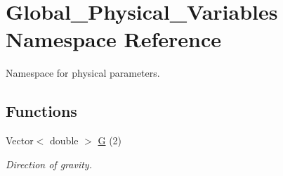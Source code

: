 \hypertarget{namespaceGlobal__Physical__Variables}{}\section{Global\+\_\+\+Physical\+\_\+\+Variables Namespace Reference}
\label{namespaceGlobal__Physical__Variables}


Namespace for physical parameters.  


\subsection*{Functions}
\begin{DoxyCompactItemize}
\item 
Vector$<$ double $>$ \hyperlink{namespaceGlobal__Physical__Variables_a37a6f46efcb35b4bd12c73f19d741020}{G} (2)
\begin{DoxyCompactList}\small\item\em Direction of gravity. \end{DoxyCompactList}\end{DoxyCompactItemize}
